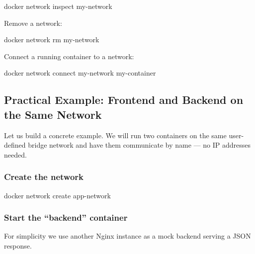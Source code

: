 \documentclass[11pt,american,a4paper,openany]{book}
\newenvironment{Shaded}{}{}
\newcommand{\NormalTok}[1]{#1}
\begin{document}
\begin{Shaded}
\begin{Highlighting}[]
\NormalTok{docker network inspect my{-}network}
\end{Highlighting}
\end{Shaded}

Remove a network:

\begin{Shaded}
\begin{Highlighting}[]
\NormalTok{docker network rm my{-}network}
\end{Highlighting}
\end{Shaded}

Connect a running container to a network:

\begin{Shaded}
\begin{Highlighting}[]
\NormalTok{docker network connect my{-}network my{-}container}
\end{Highlighting}
\end{Shaded}

\subsection{Practical Example: Frontend and Backend on the Same
Network}\label{practical-example-frontend-and-backend-on-the-same-network}

Let us build a concrete example. We will run two containers on the same
user-defined bridge network and have them communicate by name --- no IP
addresses needed.

\subsubsection{Create the network}\label{create-the-network}

\begin{Shaded}
\begin{Highlighting}[]
\NormalTok{docker network create app{-}network}
\end{Highlighting}
\end{Shaded}

\subsubsection{Start the ``backend''
container}\label{start-the-backend-container}

For simplicity we use another Nginx instance as a mock backend serving a
JSON response.
\end{document}
